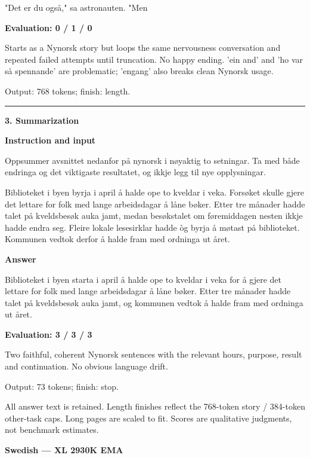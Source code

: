 \documentclass[10pt]{article}
\begin{document}
{\begin{minipage}{\textwidth}
\par\smallskip
"Det er du også," sa astronauten. "Men\par\smallskip
\textbf{Evaluation: 0 / 1 / 0}\par Starts as a Nynorsk story but loops the same nervousness conversation and repeated failed attempts until truncation. No happy ending. 'ein and' and 'ho var så spennande' are problematic; 'engang' also breaks clean Nynorsk usage.
\par {\color{gray} Output: 768 tokens; finish: length.}\par
\medskip\hrule\smallskip
{\bfseries 3. Summarization}\par\smallskip
\textbf{Instruction and input}\par Oppsummer avsnittet nedanfor på nynorsk i nøyaktig to setningar. Ta med både endringa og det viktigaste resultatet, og ikkje legg til nye opplysningar.
\par\smallskip
Biblioteket i byen byrja i april å halde ope to kveldar i veka. Forsøket skulle gjere det lettare for folk med lange arbeidsdagar å låne bøker. Etter tre månader hadde talet på kveldsbesøk auka jamt, medan besøkstalet om føremiddagen nesten ikkje hadde endra seg. Fleire lokale lesesirklar hadde òg byrja å møtast på biblioteket. Kommunen vedtok derfor å halde fram med ordninga ut året.\par\smallskip
\textbf{Answer}\par Biblioteket i byen starta i april å halde ope to kveldar i veka for å gjere det lettare for folk med lange arbeidsdagar å låne bøker. Etter tre månader hadde talet på kveldsbesøk auka jamt, og kommunen vedtok å halde fram med ordninga ut året.\par\smallskip
\textbf{Evaluation: 3 / 3 / 3}\par Two faithful, coherent Nynorsk sentences with the relevant hours, purpose, result and continuation. No obvious language drift.
\par {\color{gray} Output: 73 tokens; finish: stop.}\par
\medskip\footnotesize All answer text is retained. Length finishes reflect the 768-token story / 384-token other-task caps. Long pages are scaled to fit. Scores are qualitative judgments, not benchmark estimates.
\end{minipage}}%
\noindent\ifdim\dimexpr\ht\languagepage+\dp\languagepage\relax>0.93\textheight%
\resizebox*{!}{0.93\textheight}{\usebox{\languagepage}}%
\else\usebox{\languagepage}\fi%
\clearpage
{\Large\bfseries Swedish --- XL 2930K EMA}\par\smallskip
\end{document}
